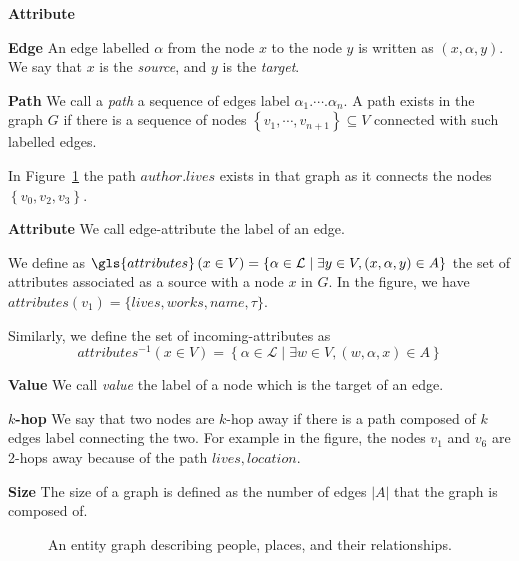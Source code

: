 \begin{labeling}{\textbf{Attribute}}
	\item[\textbf{Edge}] An edge labelled $\alpha$ from the node $x$ to the node $y$ is written as $\left(x, \alpha, y\right)$. We say that $x$ is the \emph{source}, and $y$ is the \emph{target}.

	\item[\textbf{Path}] We call a \emph{path} a sequence of edges label $\alpha_1.\cdots.\alpha_n$. A path exists in the graph $G$ if there is a sequence of nodes $\left\lbrace v_1, \cdots, v_{n+1} \right\rbrace \subseteq V$ connected with such labelled edges.

	In Figure~\ref{chap2:semi-structured-data:fig:graph} the path $author.lives$ exists in that graph as it connects the nodes $\left\lbrace v_0, v_2, v_3 \right\rbrace$.

	\item[\textbf{Attribute}] We call \gls{edge-attribute} the label of an edge.

		We define as $\gls{attributes}\left(x \in V\right) = \left\lbrace \alpha \in \mathcal{L} \mid \exists y \in V, (x, \alpha, y) \in A \right\rbrace$ the set of attributes associated as a source with a node $x$ in $G$. In the figure, we have $attributes(v_1) = \{lives,works,name,\tau\}$.

		Similarly, we define the set of \gls{incoming-attributes} as
	$$
	attributes^{-1}\left(x \in V\right) = \left\lbrace \alpha \in \mathcal{L} \mid \exists w \in V, (w, \alpha, x) \in A \right\rbrace
	$$
	\item[\textbf{Value}] We call \emph{value} the label of a node which is the target of an edge.

	\item[\textbf{$k$-hop}] We say that two nodes are $k$-hop away if there is a path composed of $k$ edges label connecting the two. For example in the figure, the nodes $v_1$ and $v_6$ are 2-hops away because of the path $lives, location$.

	\item[\textbf{Size}] The size of a graph is defined as the number of edges $\vert A \vert$ that the graph is composed of.
\end{labeling}

\begin{figure}
	\centering
	\resizebox{\textwidth}{!}{
		
	}
	\caption{An entity graph describing people, places, and their relationships.}
	\label{chap2:semi-structured-data:fig:graph}
\end{figure}

